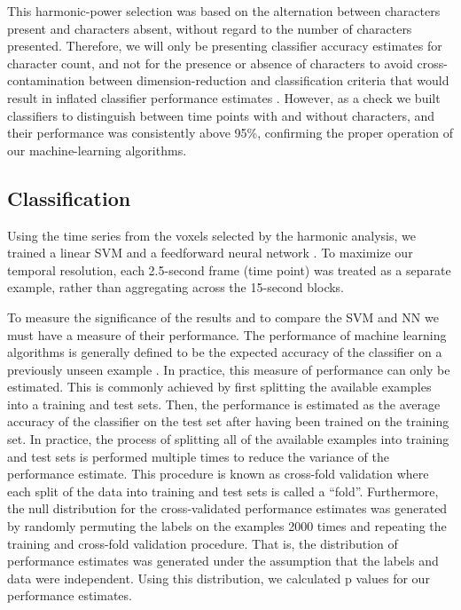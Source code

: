 \documentclass[preprint,5p,authoryear]{elsarticle}
\begin{document}
This harmonic-power selection was based on the alternation between characters present and characters absent, without regard to the number of characters presented. 
Therefore, we will only be presenting classifier accuracy estimates for character count, and not for the presence or absence of characters to avoid cross-contamination between dimension-reduction and  classification criteria that would result in inflated classifier performance estimates \citep{Pereira2009}.
However, as a check we built classifiers to distinguish between time points with and without characters, and their performance was consistently above 95\%, confirming the proper operation of our machine-learning algorithms.

\subsection{Classification}
Using the time series from the voxels selected by the harmonic analysis, we trained a linear SVM \citep{Cortes1995} and a feedforward neural network \citep{Hornik1989,Hagan1994}.
To maximize our temporal resolution, each 2.5-second frame (time point) was treated as a separate example, rather than aggregating across the 15-second blocks.

To measure the significance of the results and to compare the SVM and NN we must have a measure of their performance.
The performance of machine learning algorithms is generally defined to be the expected accuracy of the classifier on a previously unseen example \citep{Bishop2006}.
In practice, this measure of performance can only be estimated.
This is commonly achieved by first splitting the available examples into a training and test sets.
Then, the performance is estimated as the average accuracy of the classifier on the test set after having been trained on the training set.
In practice, the process of splitting all of the available examples into training and test sets is performed multiple times to reduce the variance of the performance estimate.
This procedure is known as cross-fold validation \citep{Kohavi1995} where each split of the data into training and test sets is called a ``fold''.
Furthermore, the null distribution for the cross-validated performance estimates was generated by randomly permuting the labels on the examples 2000 times and repeating the training and cross-fold validation procedure.
That is, the distribution of performance estimates was generated under the assumption that the labels and data were independent.
Using this distribution, we calculated p values for our performance estimates.
\end{document}

